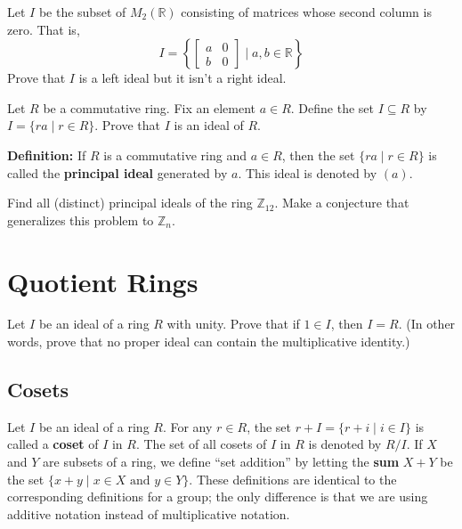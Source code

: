 \begin{problem}
Let \(I\) be the subset of \(M_2(\mathbb{R})\) consisting of matrices whose second column is zero. That is, \[I=\left\{ \begin{bmatrix}a & 0 \\ b & 0\end{bmatrix} \mid a,b\in \mathbb{R}\right\}\]
Prove that \(I\) is a left ideal but it isn't a right ideal.
\end{problem}

\begin{problem}
Let \(R\) be a commutative ring. Fix an element \(a \in R\). Define the set \(I \subseteq R\) by \(I = \{ ra \mid r\in R\}\). Prove that \(I\) is an ideal of \(R\).
\end{problem}

\textbf{Definition:} If \(R\) is a commutative ring and \(a\in R\), then the set \(\{ra \mid r\in R\}\) is called the \textbf{principal ideal} generated by \(a\). This ideal is denoted by \((a)\).

\begin{problem}
Find all (distinct) principal ideals of the ring \(\mathbb{Z}_{12}\). Make a conjecture that generalizes this problem to \(\mathbb{Z}_n\).
\end{problem}

\chapter{Quotient Rings}

\begin{problem}
Let \(I\) be an ideal of a ring \(R\) with unity. Prove that if \(1\in I\), then \(I=R\). (In other words, prove that no proper ideal can contain the multiplicative identity.)
\end{problem}

\section{Cosets}

Let \(I\) be an ideal of a ring \(R\). For any \(r\in R\), the set \(r+I = \{r+i \mid i \in I\}\) is called a \textbf{coset} of \(I\) in \(R\). The set of all cosets of \(I\) in \(R\) is denoted by \(R/I\). If \(X\) and \(Y\) are subsets of a ring, we define ``set addition'' by letting the \textbf{sum} \(X+Y\) be the set \(\{x+y \mid x\in X \mbox{ and } y\in Y\}\).
These definitions are identical to the corresponding definitions for a group; the only difference is that we are using additive notation instead of multiplicative notation.

